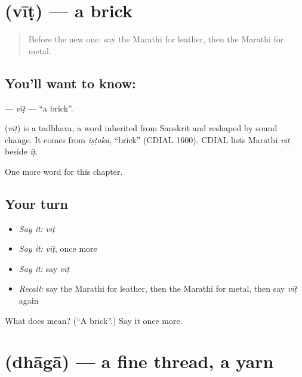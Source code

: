 \section[\texorpdfstring{\mr{वीट} (vīṭ)}{वीट (vīṭ)}]{ (vīṭ) — a brick}

\label{lesson:MR-C242-vit}



\begin{quote}
Before the new one: say the Marathi for leather, then the Marathi for metal.
\end{quote}

\subsection*{You'll want to know: }
\textbf{} — \emph{vīṭ} — \textquotedblleft{}a brick\textquotedblright{}.

\begin{cousinweb}
\textbf{} (\emph{vīṭ}) is a tadbhava, a word inherited from Sanskrit and reshaped by sound change. It comes from \emph{iṣṭakā}, \textquotedblleft{}brick\textquotedblright{} (CDIAL 1600). CDIAL lists Marathi \emph{vīṭ} beside \emph{īṭ}.
\end{cousinweb}

\begin{grammarlens}[title={What you've built}]
One more word for this chapter.
\end{grammarlens}

\subsection*{Your turn}
\begin{itemize}
\raggedright
  \item \emph{Say it:} \emph{vīṭ}
  \item \emph{Say it:} \emph{vīṭ}, once more
  \item \emph{Say it:} say \emph{vīṭ}
  \item \emph{Recall:} say the Marathi for leather, then the Marathi for metal, then say \emph{vīṭ} again
\end{itemize}

\begin{tcolorbox}[breakable,colback=teal!4,colframe=teal!35!black,title={Before you move on}]
What does  mean? (\textquotedblleft{}A brick\textquotedblright{}.) Say it once more.
\end{tcolorbox}
\section[\texorpdfstring{\mr{धागा} (dhāgā)}{धागा (dhāgā)}]{ (dhāgā) — a fine thread, a yarn}

